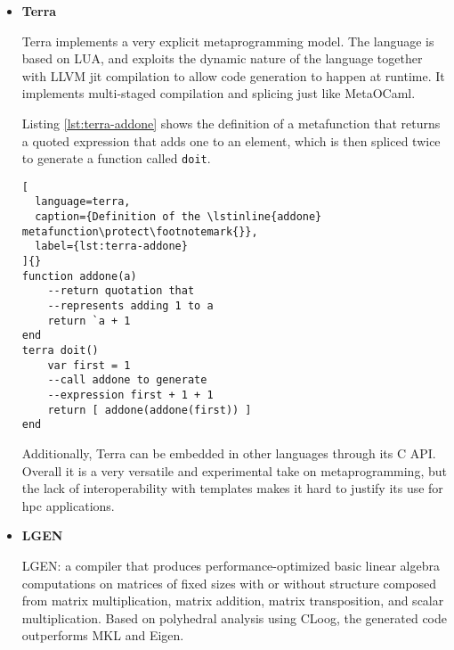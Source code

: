 \documentclass[../main]{subfiles}
\begin{document}
\begin{itemize}
Here we can find an example taken from The Rust Programming Language
book \cite{rust-book} where a simplified version of the \lstinline{vec!} macro,
which initializes a vector and pre-fills it with a static number of values,
is defined:

\begin{lstlisting}[
  language=rust,
  caption={Definition of the \lstinline{vec!} macro\protect\footnotemark{}},
  label={lst:rust-vec-macro}
]{}
#[macro_export]
macro_rules! vec {
  ( $( $x:expr ),* ) => {
    {
      let mut temp_vec = Vec::new();
      $(
        temp_vec.push($x);
      )*
      temp_vec
    }
  };
}
\end{lstlisting}

\clearpage%

\item
\textbf{Terra}

Terra\cite{terra} implements a very explicit metaprogramming model.
The language is based on LUA, and exploits the dynamic nature of the language
together with LLVM \gls{jit} compilation to allow code generation
to happen at runtime.
It implements multi-staged compilation and splicing just like MetaOCaml.

Listing \ref{lst:terra-addone} shows the definition of a metafunction that
returns a quoted expression that adds one to an element, which is then spliced
twice to generate a function called \lstinline{doit}.

\begin{lstlisting}[
  language=terra,
  caption={Definition of the \lstinline{addone} metafunction\protect\footnotemark{}},
  label={lst:terra-addone}
]{}
function addone(a)
    --return quotation that
    --represents adding 1 to a
    return `a + 1
end
terra doit()
    var first = 1
    --call addone to generate
    --expression first + 1 + 1
    return [ addone(addone(first)) ]
end
\end{lstlisting}

Additionally, Terra can be embedded in other languages through its C API.
Overall it is a very versatile and experimental take on metaprogramming,
but the lack of interoperability with \cpp templates makes it hard to justify
its use for \gls{hpc} applications.

\item
\textbf{LGEN}

LGEN\cite{hpcs15}:
a compiler that produces performance-optimized
basic linear algebra computations on matrices
of fixed sizes with or without structure composed
from matrix multiplication, matrix addition, matrix
transposition, and scalar multiplication. Based on
polyhedral analysis using CLoog, the generated code
outperforms MKL and Eigen.

\end{itemize}
\end{document}
